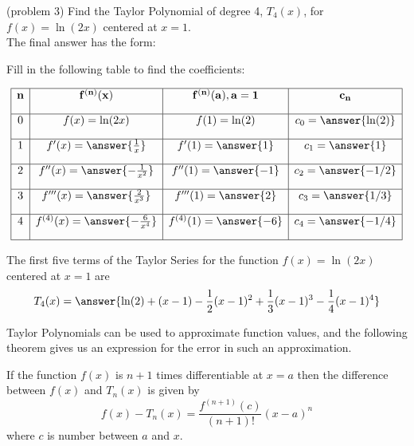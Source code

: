 \documentclass[handout]{ximera}
\begin{document}
\begin{problem}(problem 3) Find the Taylor Polynomial of degree 4, $T_4(x)$, for $f(x) = \ln(2x)$ centered at $x = 1$.\\


The final answer has the form:
\begin{center}
\begin{multipleChoice}
\end{multipleChoice}
\end{center}

Fill in the following table to find the coefficients:

\[
\begin{array}{|c|c|c|c|} 
\hline
\bf{n} & \bf{f^{(n)}(x)} & \bf{f^{(n)}(a), a = 1} & \bf{c_n} \\[1em] 
\hline
 0 & f(x) = \ln(2x) & f(1) = \ln(2) & c_0 = \answer{\ln(2)} \\[1em]
\hline
1 & f'(x) = \answer{\frac{1}{x}} & f'(1) = \answer{1} & c_1 = \answer{1} \\[1em]
\hline
 2 & f''(x) =\answer{-\frac{1}{x^2}} & f''(1) = \answer{-1} & c_2 = \answer{-1/2} \\[1em]
\hline
 3 & f'''(x) =\answer{\frac{2}{x^3}} & f'''(1) = \answer{2} & c_3 = \answer{1/3}\\[1em]
\hline
 4 & f^{(4)}(x) =\answer{-\frac{6}{x^4}} & f^{(4)}(1) = \answer{-6} & c_4 = \answer{-1/4}\\[1em]
\hline
\end{array}
\]


The first five terms of the Taylor Series for the function $f(x) = \ln(2x)$ centered at $x = 1$ are
\[
T_4(x) = \answer{\ln(2) + (x-1) -\frac12(x-1)^2 + \frac13(x-1)^3-\frac14(x-1)^4}
\]


\end{problem}

Taylor Polynomials can be used to approximate function values, and the following theorem gives us an expression for the error in such an approximation.

\begin{theorem}
If the function $f(x)$ is $n+1$ times differentiable at $x = a$ then the difference between $f(x)$ and $T_n(x)$
is given by 
\[
f(x) - T_n(x) = \frac{f^{(n+1)}(c)}{(n+1)!}(x-a)^n
\]
where $c$ is number between $a$ and $x$.
\end{theorem}
\end{document}
